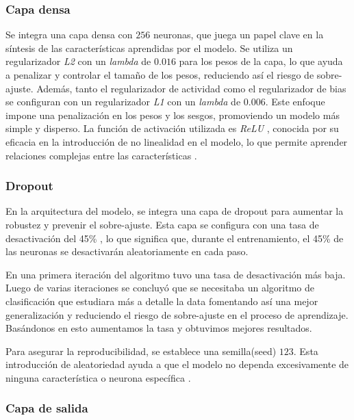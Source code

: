    \subsubsection{Capa densa}
   
   Se integra una capa densa con $256$ neuronas, que juega un papel clave en la síntesis de las características aprendidas por el modelo. Se utiliza un regularizador \textit{L2} con un \textit{lambda} de $0.016$ para los pesos de la capa, lo que ayuda a penalizar y controlar el tamaño de los pesos, reduciendo así el riesgo de sobre-ajuste. Además, tanto el regularizador de actividad como el regularizador de bias se configuran con un regularizador \textit{L1} con un \textit{lambda} de $0.006$. Este enfoque impone una penalización en los pesos y los sesgos, promoviendo un modelo más simple y disperso. La función de activación utilizada es \textit{ReLU} , conocida por su eficacia en la introducción de no linealidad en el modelo, lo que permite aprender relaciones complejas entre las características .
   
   \subsubsection{Dropout}
   
   En la arquitectura del modelo, se integra una capa de dropout para aumentar la robustez y prevenir el sobre-ajuste. Esta capa se configura con una tasa de desactivación del 45\% , lo que significa que, durante el entrenamiento, el 45\% de las neuronas se desactivarán aleatoriamente en cada paso. 
   
   En una primera iteración del algoritmo tuvo una tasa de desactivación más baja. Luego de varias iteraciones se concluyó que se necesitaba un algoritmo de clasificación que estudiara más a detalle la data fomentando así una mejor generalización y reduciendo el riesgo de sobre-ajuste en el proceso de aprendizaje. Basándonos en esto aumentamos la tasa y obtuvimos mejores resultados.
   
   Para asegurar la reproducibilidad, se establece una semilla(seed) $123$. Esta introducción de aleatoriedad ayuda a que el modelo no dependa excesivamente de ninguna característica o neurona específica .
   
   \subsubsection{Capa de salida}
   
